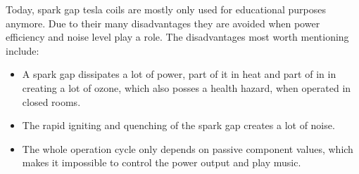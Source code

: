 Today, spark gap tesla coils are mostly only used for educational purposes anymore. Due to their many disadvantages they are avoided when power efficiency and noise level play a role. The disadvantages most worth mentioning include:

\begin{itemize}
    \item A spark gap dissipates a lot of power, part of it in heat and part of in in creating a lot of ozone, which also posses a health hazard, when operated in closed rooms.
    \item The rapid igniting and quenching of the spark gap creates a lot of noise.
    \item The whole operation cycle only depends on passive component values, which makes it impossible to control the power output and play music.
\end{itemize}

